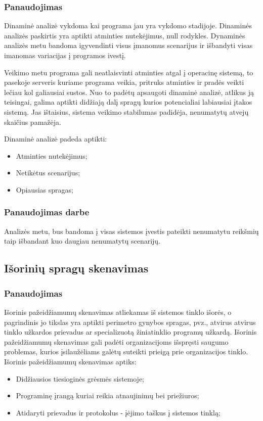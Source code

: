 \documentclass[a4paper,12pt,fleqn]{article}
\begin{document}
\subsubsection{Panaudojimas}
\label{sec:data}
Dinaminė analizė vykdoma kai programa jau yra vykdomo stadijoje. Dinaminės analizės paskirtis yra aptikti atminties nutekėjimus, null rodykles. Dynaminės analizės metu bandoma igyvendinti visus įmanomus scenarijus ir išbandyti visas imanomas variacijas į programos ivestį.

Veikimo metu programa gali neatlaisvinti atminties atgal į operacinę sistemą, to pasekoje serveris kuriame programa veikia, pritruks atminties ir pradės veikti lečiau kol galiausiai sustos. Nuo to padėtų apsaugoti dinaminė analizė, atlikus ją teisingai, galima aptikti didžiają dalį spragų kurios potencialiai labiausiai įtakos sistemą. Jas ištaisius, sistema veikimo stabilumas padidėja, nenumatytų atvejų skaičius pamažėja.

Dinaminė analizė padeda aptikti:
\begin{itemize}
	\item Atminties nutekėjimus;
	\item Netikėtus scenarijus;
	\item Opiausias spragas;
\end{itemize}

\subsubsection{Panaudojimas darbe}
\label{sec:data}
Analizės metu, bus bandoma į visas sistemos įvestis pateikti nenumatytu reikšmių taip išbandant kuo daugiau nenumatytų scenarijų.

\subsection{Išorinių spragų skenavimas}
\label{sec:example}

\subsubsection{Panaudojimas}
Išorinis pažeidžiamumų skenavimas atliekamas iš sistemos tinklo išorės, o pagrindinis jo tikslas yra aptikti perimetro gynybos spragas, pvz., atvirus atvirus tinklo užkardos prievadus ar specializuotą žiniatinklio programų užkardą. Išorinis pažeidžiamumų skenavimas gali padėti organizacijoms išspręsti saugumo problemas, kurios įsilaužėliams galėtų suteikti prieigą prie organizacijos tinklo.
\newline
Išorinis pažeidžiamumų skenavimas aptiks:
\begin{itemize}
	\item Didžiausios tiesioginės grėsmės sistemoje;
	\item Programinę įrangą kuriai reikia atnaujinimų bei priežiuros;
	\item Atidaryti prievadus ir protokolus - įėjimo taškus į sistemos tinklą;
\end{itemize}
\end{document}
